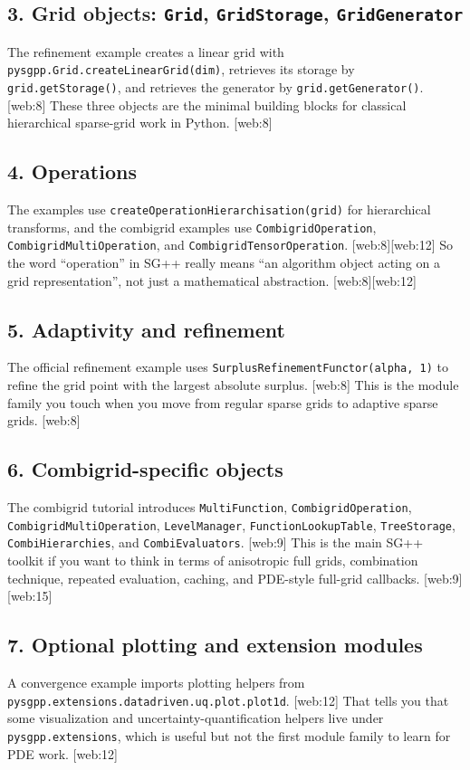 \documentclass[11pt,a4paper]{article}
\begin{document}
\subsection*{3. Grid objects: \texttt{Grid}, \texttt{GridStorage}, \texttt{GridGenerator}}
The refinement example creates a linear grid with \texttt{pysgpp.Grid.createLinearGrid(dim)}, retrieves its storage by \texttt{grid.getStorage()}, and retrieves the generator by \texttt{grid.getGenerator()}. [web:8]  
These three objects are the minimal building blocks for classical hierarchical sparse-grid work in Python. [web:8]  

\subsection*{4. Operations}
The examples use \texttt{createOperationHierarchisation(grid)} for hierarchical transforms, and the combigrid examples use \texttt{CombigridOperation}, \texttt{CombigridMultiOperation}, and \texttt{CombigridTensorOperation}. [web:8][web:12]  
So the word ``operation'' in SG++ really means ``an algorithm object acting on a grid representation'', not just a mathematical abstraction. [web:8][web:12]  

\subsection*{5. Adaptivity and refinement}
The official refinement example uses \texttt{SurplusRefinementFunctor(alpha, 1)} to refine the grid point with the largest absolute surplus. [web:8]  
This is the module family you touch when you move from regular sparse grids to adaptive sparse grids. [web:8]  

\subsection*{6. Combigrid-specific objects}
The combigrid tutorial introduces \texttt{MultiFunction}, \texttt{CombigridOperation}, \texttt{CombigridMultiOperation}, \texttt{LevelManager}, \texttt{FunctionLookupTable}, \texttt{TreeStorage}, \texttt{CombiHierarchies}, and \texttt{CombiEvaluators}. [web:9]  
This is the main SG++ toolkit if you want to think in terms of anisotropic full grids, combination technique, repeated evaluation, caching, and PDE-style full-grid callbacks. [web:9][web:15]  

\subsection*{7. Optional plotting and extension modules}
A convergence example imports plotting helpers from \texttt{pysgpp.extensions.datadriven.uq.plot.plot1d}. [web:12]  
That tells you that some visualization and uncertainty-quantification helpers live under \texttt{pysgpp.extensions}, which is useful but not the first module family to learn for PDE work. [web:12]  
\end{document}

